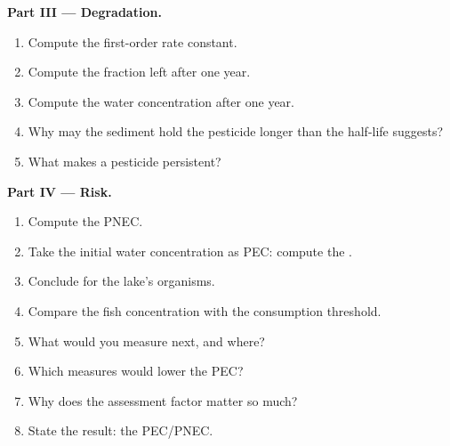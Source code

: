 \begin{problem}
\medskip\noindent\textbf{Part III --- Degradation.}
\begin{enumerate}[resume]
  \item Compute the first-order rate constant.
  \item Compute the fraction left after one year.
  \item Compute the water concentration after one year.
  \item Why may the sediment hold the pesticide longer than the half-life suggests?
  \item What makes a pesticide persistent?
\end{enumerate}

\medskip\noindent\textbf{Part IV --- Risk.}
\begin{enumerate}[resume]
  \item Compute the PNEC.
  \item Take the initial water concentration as PEC: compute the .
  \item Conclude for the lake's organisms.
  \item Compare the fish concentration with the consumption threshold.
  \item What would you measure next, and where?
  \item Which measures would lower the PEC?
  \item Why does the assessment factor matter so much?
  \item State the result: the  PEC/PNEC.
\end{enumerate}
\end{problem}
